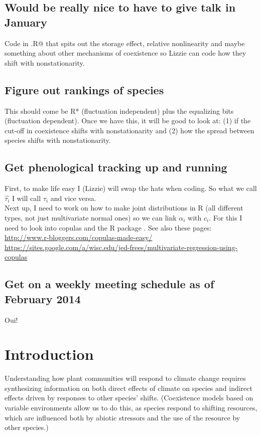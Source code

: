 \documentclass[11pt,a4paper,oneside]{article}
\begin{document}
\subsection{Would be really nice to have to give talk in January}
Code in \verb@PhenologyModel.R@ that spits out the storage effect, relative nonlinearity and maybe something about other mechanisms of coexistence so Lizzie can code how they shift with nonstationarity.

\subsection{Figure out rankings of species}
This should come be R* (fluctuation independent) plus the equalizing bits (fluctuation dependent). Once we have this, it will be good to look at: (1) if the cut-off in coexistence shifts with nonstationarity and (2) how the spread between species shifts with nonstationarity.

\subsection{Get phenological tracking up and running}
First, to make life easy I (Lizzie) will swap the hats when coding. So what we call \(\hat{\tau_{i}}\) I will call \(\tau_{i}\) and vice versa.\\

\noindent Next up, I need to work on how to make joint distributions in R (all different types, not just multivariate normal ones) so we can link \(\alpha_{i}\) with \(c_{i}\). For this I need to look into copulas and the R package \verb@copula@. See also these pages:\\
\url{http://www.r-bloggers.com/copulas-made-easy/}\\
\url{https://sites.google.com/a/wisc.edu/jed-frees/multivariate-regression-using-copulas}

\subsection{Get on a weekly meeting schedule as of February 2014}
Oui!


\section{Introduction}
\noindent Understanding how plant communities will respond to climate change
requires synthesizing information on both direct effects of climate on species
and indirect effects driven by responses to other species'
shifts. (Coexistence models based on variable environments allow us to
do this, as species respond to shifting resources, which are
influenced both by abiotic stressors and the use of the resource by
other species.)
\end{document}
